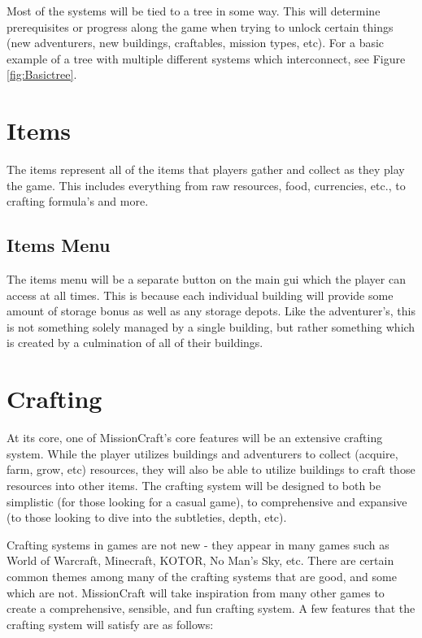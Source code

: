 Most of the systems will be tied to a tree in some way. This will determine prerequisites or progress along the game when trying to unlock certain things (new adventurers, new buildings, craftables, mission types, etc). For a basic example of a tree with multiple different systems which interconnect, see Figure \ref{fig:Basictree}.








\section{Items}

The items represent all of the items that players gather and collect as they play the game. This includes everything from raw resources, food, currencies, etc., to crafting formula's and more.

\subsection{Items Menu}

The items menu will be a separate button on the main gui which the player can access at all times. This is because each individual building will provide some amount of storage bonus as well as any storage depots. Like the adventurer's, this is not something solely managed by a single building, but rather something which is created by a culmination of all of their buildings.






\section{Crafting}

At its core, one of MissionCraft's core features will be an extensive crafting system. While the player utilizes buildings and adventurers to collect (acquire, farm, grow, etc) resources, they will also be able to utilize buildings to craft those resources into other items. The crafting system will be designed to both be simplistic (for those looking for a casual game), to comprehensive and expansive (to those looking to dive into the subtleties, depth, etc). 

Crafting systems in games are not new - they appear in many games such as World of Warcraft, Minecraft, KOTOR, No Man's Sky, etc. There are certain common themes among many of the crafting systems that are good, and some which are not. MissionCraft will take inspiration from many other games to create a comprehensive, sensible, and fun crafting system. A few features that the crafting system will satisfy are as follows:

